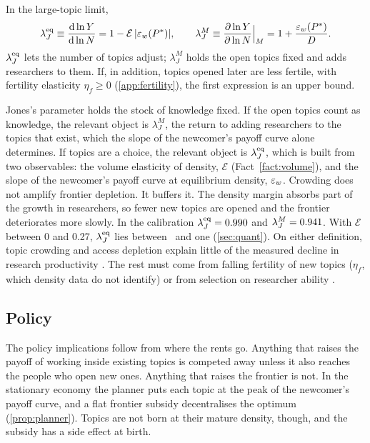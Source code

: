 \begin{proposition}\label{prop:sot}
In the large-topic limit,
\begin{equation}\label{eq:sot}
\lambda_J^{\rm eq}\equiv\frac{\mathrm{d}\ln Y}{\mathrm{d}\ln N}=1-\mathcal E\,|\varepsilon_w(P^*)|,
\qquad
\lambda_J^{M}\equiv\frac{\partial\ln Y}{\partial\ln N}\Big|_{M}=1+\frac{\varepsilon_w(P^*)}{D}.
\end{equation}
$\lambda_J^{\rm eq}$ lets the number of topics adjust; $\lambda_J^M$ holds the
open topics fixed and adds researchers to them. If, in addition, topics opened
later are less fertile, with fertility elasticity $\eta_f\ge0$
(\cref{app:fertility}), the first expression is an upper bound.
\end{proposition}

Jones's parameter holds the stock of knowledge fixed. If the open topics count
as knowledge, the relevant object is $\lambda_J^M$, the return to adding
researchers to the topics that exist, which the slope of the newcomer's payoff
curve alone determines. If topics are a choice, the relevant object is
$\lambda_J^{\rm eq}$, which is built from two observables: the volume
elasticity of density, $\mathcal E$ (Fact~\ref{fact:volume}), and the slope of
the newcomer's payoff curve at equilibrium density, $\varepsilon_w$. Crowding does not
amplify frontier depletion. It buffers it. The density margin absorbs part of
the growth in researchers, so fewer new topics are opened and the frontier
deteriorates more slowly. In the calibration $\lambda_J^{\rm eq}=0.990$
and $\lambda_J^M=0.941$. With $\mathcal E$ between 0 and 0.27,
$\lambda_J^{\rm eq}$ lies between \calLambdaLo\ and one (\cref{sec:quant}). On
either definition, topic crowding and access depletion explain little of the
measured decline in research productivity \citep{bloometal2020}. The rest must
come from falling fertility of new topics ($\eta_f$, which density data do not
identify) or from selection on researcher ability \citep{ekerdtwu2024}.

\subsection{Policy}

The policy implications follow from where the rents go. Anything that raises
the payoff of working inside existing topics is competed away unless it also
reaches the people who open new ones. Anything that raises the frontier is
not. In the stationary economy the planner puts each topic at the peak of the
newcomer's payoff curve, and a flat frontier subsidy decentralises the optimum
(\cref{prop:planner}). Topics are not born at their mature density, though, and
the subsidy has a side effect at birth.

